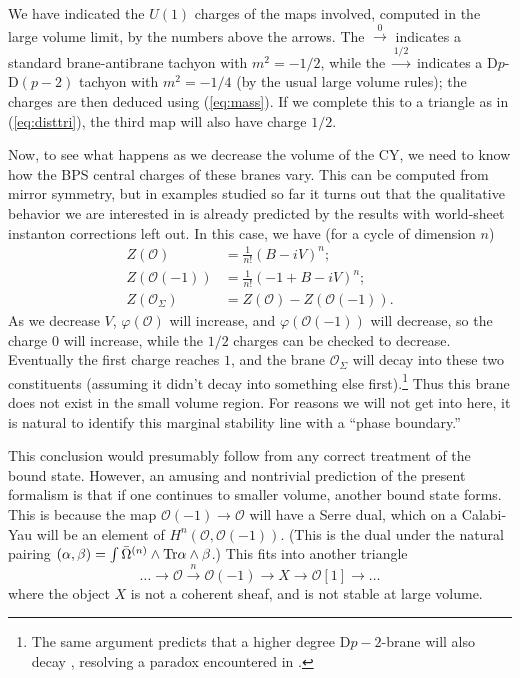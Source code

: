 \documentclass[a4paper,12pt]{amsart}
\numberwithin{equation}{section}
\theoremstyle{plain}
\theoremstyle{definition}
\def\mapr{\mathop{\longrightarrow}\limits}
\def\grade{\varphi}
\def\cal{\mathcal}
\def \Tr {{\rm Tr}}
\def\CO{{\cal O}}
\begin{document}
We have indicated the $U(1)$ charges of the maps involved, computed in
the large volume limit, by the numbers above the arrows.  The
$\mapr^0$ indicates a standard brane-antibrane tachyon with
$m^2=-1/2$, while the $\mapr^{1/2}$ indicates a D$p$-D$(p-2)$ tachyon
with $m^2=-1/4$ (by the usual large volume rules); the charges are
then deduced using (\ref{eq:mass}).  If we complete this to a triangle
as in (\ref{eq:disttri}), the third map will also have charge $1/2$.

Now, to see what happens as we decrease the volume of the CY, we need
to know how the BPS central charges of these branes vary.  This can be
computed from mirror symmetry, but in examples studied so far it turns
out that the qualitative behavior we are interested in is already
predicted by the results with world-sheet instanton corrections left out.
In this case, we have (for a cycle of dimension $n$)
\begin{eqnarray}
Z(\CO) &= \frac{1}{n!}(B-iV)^n; \\
Z(\CO(-1)) &= \frac{1}{n!}(-1+B-iV)^n; \\
Z(\CO_\Sigma) &= Z(\CO) - Z(\CO(-1)).
\end{eqnarray}
As we decrease $V$, $\grade(\CO)$ will increase, and $\grade(\CO(-1))$
will decrease, so the charge $0$ will increase, while the $1/2$ charges
can be checked to decrease.  Eventually the first charge reaches $1$, and
the brane $\CO_\Sigma$ will decay into these two constituents (assuming
it didn't decay into something else first).\footnote{The same argument
predicts that a higher degree D$p-2$-brane will also decay \cite{DW}, 
resolving a paradox encountered in \cite{MSW}.}
Thus this brane does not
exist in the small volume region.  For reasons we will not get into 
here, it is natural to identify this marginal
stability line with a ``phase boundary.''

This conclusion would presumably follow from any correct treatment of
the bound state.  However, an amusing and nontrivial prediction of the
present formalism is that if one continues to smaller volume, another
bound state forms.  This is because the map $\CO(-1)\mapr \CO$ will
have a Serre dual, which on a Calabi-Yau will be an element of
$H^n(\CO,\CO(-1))$.  (This is the dual under the natural pairing
$(\alpha,\beta)=\int \bar\Omega^{(n)} \wedge \Tr \alpha \wedge \beta$.)
This fits into another triangle
\begin{equation}
\ldots \mapr \CO \mapr^n \CO(-1) \mapr X \mapr \CO[1] \mapr\ldots 
\end{equation}
where the object $X$ is not a coherent sheaf, and is not stable at
large volume.
\end{document}
